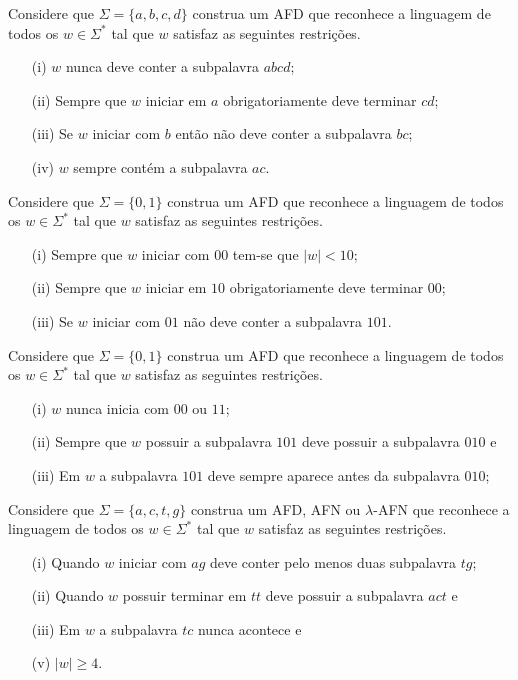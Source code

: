 \begin{questao}\label{exer:AF4}
	Considere que $\Sigma = \{a, b, c, d\}$ construa um AFD que reconhece a linguagem de todos os $w \in \Sigma^*$ tal que $w$ satisfaz as seguintes restrições.
	\begin{itemize}
		\item[(i)] $w$ nunca deve conter a subpalavra $abcd$;
		\item[(ii)] Sempre que $w$ iniciar em $a$ obrigatoriamente deve terminar $cd$;
		\item[(iii)] Se $w$ iniciar com $b$ então não deve conter a subpalavra $bc$;
		\item[(iv)] $w$ sempre contém a subpalavra $ac$.  
	\end{itemize}
\end{questao}


\begin{questao}\label{exer:AF5}
	Considere que $\Sigma = \{0, 1\}$ construa um AFD que reconhece a linguagem de todos os $w \in \Sigma^*$ tal que $w$ satisfaz as seguintes restrições.
	\begin{itemize}
		\item[(i)] Sempre que $w$ iniciar com $00$ tem-se que $|w| < 10$;
		\item[(ii)] Sempre que $w$ iniciar em $10$ obrigatoriamente deve terminar $00$;
		\item[(iii)] Se $w$ iniciar com $01$ não deve conter a subpalavra $101$.
	\end{itemize}
\end{questao}

\begin{questao}\label{exer:AF6}
	Considere que $\Sigma = \{0, 1\}$ construa um AFD que reconhece a linguagem de todos os $w \in \Sigma^*$ tal que $w$ satisfaz as seguintes restrições.
	\begin{itemize}
		\item[(i)] $w$ nunca inicia com $00$ ou $11$;
		\item[(ii)] Sempre que $w$ possuir a subpalavra $101$ deve possuir a subpalavra  $010$ e
		\item[(iii)] Em $w$ a subpalavra $101$ deve sempre aparece antes da subpalavra $010$;
	\end{itemize}
\end{questao}

\begin{questao}\label{exer:AF7}
	Considere que $\Sigma = \{a, c, t, g\}$ construa um AFD, AFN ou $\lambda$-AFN que reconhece a linguagem de todos os $w \in \Sigma^*$ tal que $w$ satisfaz as seguintes restrições.
	\begin{itemize}
		\item[(i)] Quando $w$ iniciar com $ag$ deve conter pelo menos duas subpalavra $tg$;
		\item[(ii)] Quando $w$ possuir terminar em $tt$ deve possuir a subpalavra  $act$ e
		\item[(iii)] Em $w$ a subpalavra $tc$ nunca acontece e
		\item[(v)] $|w| \geq 4$. 
	\end{itemize}
\end{questao}

